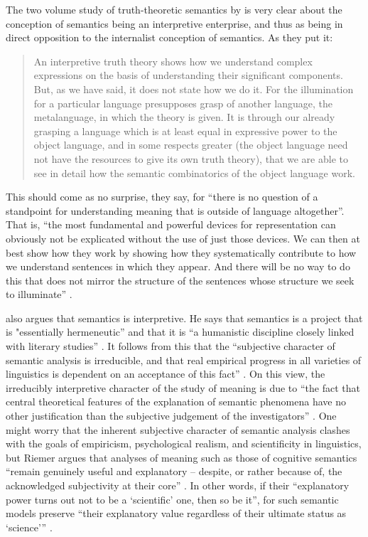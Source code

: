 The two volume study of truth-theoretic semantics by \citet{LeporeLudwig2005,LeporeLudwig2007} is very clear about the conception of semantics being an interpretive enterprise, and thus as being in direct opposition to the internalist conception of semantics. As they put it:
\begin{quote}
An interpretive truth theory shows how we understand complex expressions on the basis of understanding their significant components. But, as we have said, it does not state how we do it. For the illumination for a particular language presupposes grasp of another language, the metalanguage, in which the theory is given. It is through our already grasping a language which is at least equal in expressive power to the object language, and in some respects greater (the object language need not have the resources to give its own truth theory), that we are able to see in detail how the semantic combinatorics of the object language work. \citep[9]{LeporeLudwig2007}
\end{quote}
This should come as no surprise, they say, for “there is no question of a standpoint for understanding meaning that is outside of language altogether”. That is, “the most fundamental and powerful devices for representation can obviously not be explicated without the use of just those devices. We can then at best show how they work by showing how they systematically contribute to how we understand sentences in which they appear. And there will be no way to do this that does not mirror the structure of the sentences whose structure we seek to illuminate” \citep[9]{LeporeLudwig2007}.

\citet{Riemer2005, Riemer2010, Riemer2015} also argues that semantics is interpretive. He says that semantics is a project that is "essentially hermeneutic” and that it is “a humanistic discipline closely linked with literary studies” \citep[42-43]{Riemer2019}. It follows from this that the “subjective character of semantic analysis is irreducible, and that real empirical progress in all varieties of linguistics is dependent on an acceptance of this fact” \citep[4]{Riemer2005}. On this view, the irreducibly interpretive character of the study of meaning is due to “the fact that central theoretical features of the explanation of semantic phenomena have no other justification than the subjective judgement of the investigators” \citep[3]{Riemer2005}. One might worry that the inherent subjective character of semantic analysis clashes with the goals of empiricism, psychological realism, and scientificity in linguistics, but Riemer argues that analyses of meaning such as those of cognitive semantics \citep{LakoffJohnson1980, Lakoff1987, Langacker1987} “remain genuinely useful and explanatory – despite, or rather because of, the acknowledged subjectivity at their core” \citep[4]{Riemer2005}. In other words, if their “explanatory power turns out not to be a ‘scientific’ one, then so be it”, for such semantic models preserve “their explanatory value regardless of their ultimate status as ‘science’” \citep[4]{Riemer2005}.

